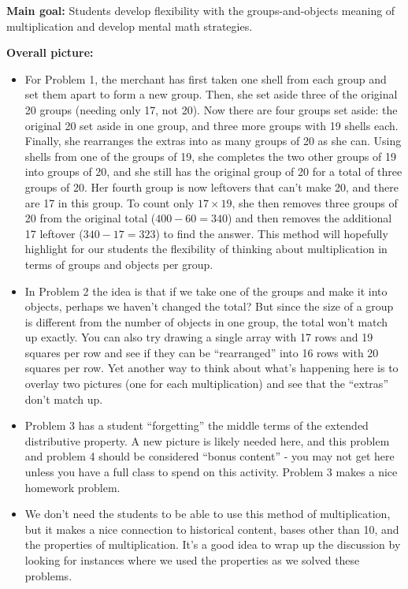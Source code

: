 \documentclass[nooutcomes, noauthor, handout]{ximera}
\begin{document}
\newpage
\begin{instructorNotes}
{\bf Main goal:} Students develop flexibility with the groups-and-objects meaning of multiplication and develop mental math strategies.


{\bf Overall picture:} 
\begin{itemize}
	\item For Problem 1, the merchant has first taken one shell from each group and set them apart to form a new group. Then, she set aside three of the original 20 groups (needing only 17, not 20). Now there are four groups set aside: the original 20 set aside in one group, and three more groups with 19 shells each. Finally, she rearranges the extras into as many groups of 20 as she can. Using shells from one of the groups of 19, she completes the two other groups of 19 into groups of 20, and she still has the original group of 20 for a total of three groups of 20. Her fourth group is now leftovers that can't make 20, and there are 17 in this group. To count only $17\times 19$, she then removes three groups of 20 from the original total ($400 - 60 = 340$) and then removes the additional 17 leftover ($340 - 17 = 323$) to find the answer. This method will hopefully highlight for our students the flexibility of thinking about multiplication in terms of groups and objects per group.
	\item In Problem 2 the idea is that if we take one of the groups and make it into objects, perhaps we haven't changed the total? But since the size of a group is different from the number of objects in one group, the total won't match up exactly. You can also try drawing a single array with 17 rows and 19 squares per row and see if they can be ``rearranged'' into 16 rows with 20 squares per row. Yet another way to think about what's happening here is to overlay two pictures (one for each multiplication) and see that the ``extras'' don't match up.
	\item Problem 3 has a student ``forgetting'' the middle terms of the extended distributive property. A new picture is likely needed here, and this problem and problem 4 should be considered ``bonus content'' - you may not get here unless you have a full class to spend on this activity. Problem 3 makes a nice homework problem.
	\item We don't need the students to be able to use this method of multiplication, but it makes a nice connection to historical content, bases other than 10, and the properties of multiplication. It's a good idea to wrap up the discussion by looking for instances where we used the properties as we solved these problems.


\end{itemize}
\end{instructorNotes}
\end{document}

